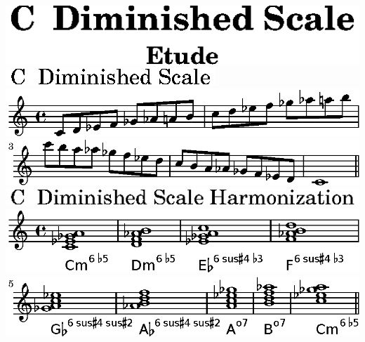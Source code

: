 \includegraphics{7f/lily-6e2c9b00-1}%
\ifx\betweenLilyPondSystem \undefined
  \linebreak
\else
  \expandafter{}%
\fi
\includegraphics{7f/lily-6e2c9b00-2}%
\ifx\betweenLilyPondSystem \undefined
  \linebreak
\else
  \expandafter{}%
\fi
\includegraphics{7f/lily-6e2c9b00-3}%
\ifx\betweenLilyPondSystem \undefined
  \linebreak
\else
  \expandafter{}%
\fi
\includegraphics{7f/lily-6e2c9b00-4}%
\ifx\betweenLilyPondSystem \undefined
  \linebreak
\else
  \expandafter{}%
\fi
\includegraphics{7f/lily-6e2c9b00-5}%
\ifx\betweenLilyPondSystem \undefined
  \linebreak
\else
  \expandafter{}%
\fi
\includegraphics{7f/lily-6e2c9b00-6}%
\ifx\betweenLilyPondSystem \undefined
  \linebreak
\else
  \expandafter{}%
\fi
\includegraphics{7f/lily-6e2c9b00-7}%
